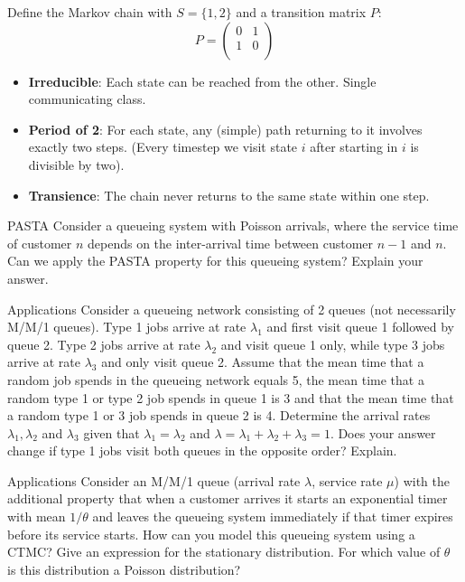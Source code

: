 \begin{solution}
	Define the Markov chain with $S=\{1,2\}$ and a transition matrix $P$:
	\[
		P = \begin{pmatrix}
		0 & 1 \\
		1 & 0 \\
		\end{pmatrix}
	\]

	\begin{itemize}
		\item \textbf{Irreducible}: Each state can be reached from the other. Single communicating class.
		\item \textbf{Period of 2}: For each state, any (simple) path returning to it involves exactly two steps. (Every timestep we visit state $i$ after starting in $i$ is divisible by two).
		\item \textbf{Transience}: The chain never returns to the same state within one step.
	\end{itemize}
\end{solution}

\begin{problem}{PASTA}
Consider a queueing system with Poisson arrivals, where the service time of customer \( n \) depends on the inter-arrival time between customer \( n - 1 \) and \( n \). Can we apply the PASTA property for this queueing system? Explain your answer.
\end{problem}

\begin{problem}{Applications}
Consider a queueing network consisting of 2 queues (not necessarily M/M/1 queues). Type 1 jobs arrive at rate \( \lambda_1 \) and first visit queue 1 followed by queue 2. Type 2 jobs arrive at rate \( \lambda_2 \) and visit queue 1 only, while type 3 jobs arrive at rate \( \lambda_3 \) and only visit queue 2. Assume that the mean time that a random job spends in the queueing network equals 5, the mean time that a random type 1 or type 2 job spends in queue 1 is 3 and that the mean time that a random type 1 or 3 job spends in queue 2 is 4. Determine the arrival rates \( \lambda_1, \lambda_2 \) and \( \lambda_3 \) given that \( \lambda_1 = \lambda_2 \) and \( \lambda = \lambda_1 + \lambda_2 + \lambda_3 = 1 \). Does your answer change if type 1 jobs visit both queues in the opposite order? Explain.
\end{problem}

\begin{problem}{Applications}
Consider an M/M/1 queue (arrival rate \( \lambda \), service rate \( \mu \)) with the additional property that when a customer arrives it starts an exponential timer with mean \( 1/\theta \) and leaves the queueing system immediately if that timer expires before its service starts. How can you model this queueing system using a CTMC? Give an expression for the stationary distribution. For which value of \( \theta \) is this distribution a Poisson distribution?
\end{problem}
